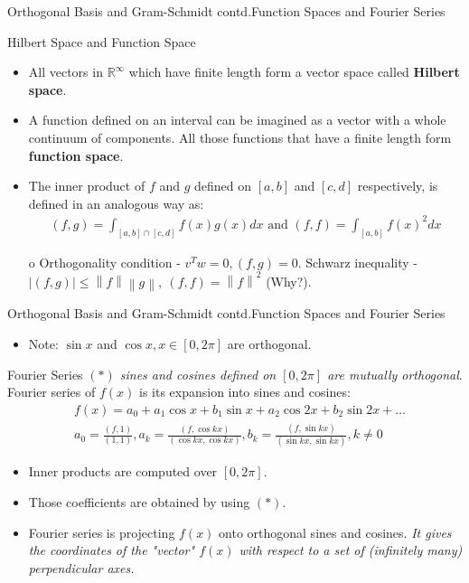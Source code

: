 \documentclass{beamer}
\begin{document}
\begin{frame}{Orthogonal Basis and Gram-Schmidt contd.}{Function Spaces and Fourier Series}
\begin{exampleblock}{Hilbert Space and Function Space}
\begin{itemize}
    \item All vectors in $\mathbb{R}^{\infty}$ which have finite length form a vector space called \textbf{Hilbert space}.
    \item A function defined on an interval can be imagined as a vector with a whole continuum of components. All those functions that have a finite length form \textbf{function space}.
    \item The inner product of $f$ and $g$ defined on $[a,b]$ and $[c,d]$ respectively, is defined in an analogous way as:
        \begin{align*}
            (f,g) = \int_{[a,b]\cap [c,d]}f(x)g(x)dx \text{ and } (f,f) = \int_{[a,b]}f(x)^2dx
        \end{align*}
    \item[o] Orthogonality condition - $v^Tw=0, (f,g) = 0$. Schwarz inequality - $|(f,g)| \leq \left\|f\right\|\left\|g\right\|, \ (f,f) = \left\|f\right\|^2$ (Why?).
\end{itemize}
\end{exampleblock}
\end{frame}

\begin{frame}{Orthogonal Basis and Gram-Schmidt contd.}{Function Spaces and Fourier Series}
\begin{itemize}
    \item Note: $\sin x$ and $\cos x, x \in [0,2\pi]$ are orthogonal.
\end{itemize}
\begin{exampleblock}{Fourier Series}
\textit{$(*)$ sines and cosines defined on $[0,2\pi]$ are mutually orthogonal}.
Fourier series of $f(x)$ is its expansion into sines and cosines:
\begin{align*}&
    f(x) = a_0 + a_1\cos x + b_1\sin x + a_2 \cos 2x + b_2\sin 2x + \ldots\\
    & a_0 = \frac{(f,1)}{(1,1)}, a_k = \frac{(f,\cos kx)}{(\cos kx,\cos kx)}, b_k = \frac{(f,\sin kx)}{(\sin kx,\sin kx)}, k \neq 0
\end{align*}
\begin{itemize}
    \item Inner products are computed over $[0,2\pi]$.
    \item Those coefficients are obtained by using $(*)$.
    \item Fourier series is projecting $f(x)$ onto orthogonal sines and cosines. \textit{It gives the coordinates of the "vector" $f(x)$ with respect to a set of (infinitely many) perpendicular axes.}
\end{itemize}
\end{exampleblock}
\end{frame}
\end{document}
